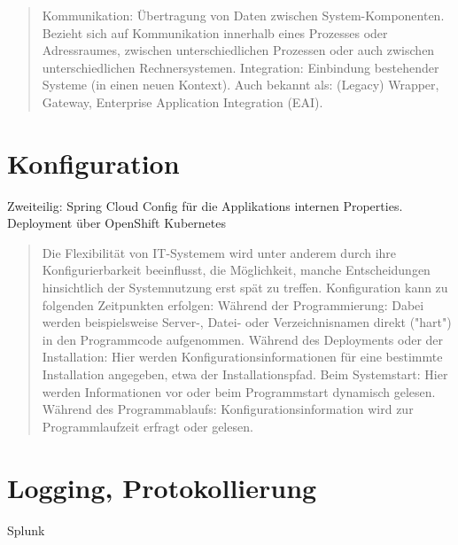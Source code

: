 \begin{quote}
	Kommunikation: Übertragung von Daten zwischen System-Komponenten. Bezieht sich auf Kommunikation innerhalb eines Prozesses oder Adressraumes, zwischen unterschiedlichen Prozessen oder auch zwischen unterschiedlichen Rechnersystemen.
	Integration: Einbindung bestehender Systeme (in einen neuen Kontext). Auch bekannt als: (Legacy) Wrapper, Gateway, Enterprise Application Integration (EAI).
\end{quote}

\section{Konfiguration}

Zweiteilig:
Spring Cloud Config für die Applikations internen Properties.
Deployment über OpenShift Kubernetes

\begin{quote}
	Die Flexibilität von IT-Systemem wird unter anderem durch ihre Konfigurierbarkeit beeinflusst, die Möglichkeit, manche Entscheidungen hinsichtlich der Systemnutzung erst spät zu treffen. Konfiguration kann zu folgenden Zeitpunkten erfolgen:
	Während der Programmierung: Dabei werden beispielsweise Server-, Datei- oder Verzeichnisnamen direkt ("hart") in den Programmcode aufgenommen.
	Während des Deployments oder der Installation: Hier werden Konfigurationsinformationen für eine bestimmte Installation angegeben, etwa der Installationspfad.
	Beim Systemstart: Hier werden Informationen vor oder beim Programmstart dynamisch gelesen.
	Während des Programmablaufs: Konfigurationsinformation wird zur Programmlaufzeit erfragt oder gelesen.
\end{quote}

\section{Logging, Protokollierung}

Splunk

